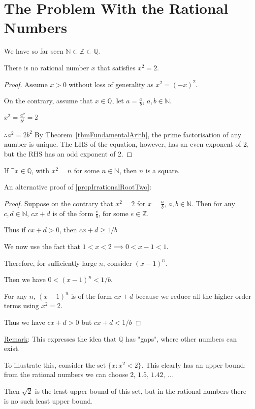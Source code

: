 \documentclass[../Main.tex]{subfiles}
\begin{document}
\section{The Problem With the Rational Numbers}
We have so far seen $\mathbb{N} \subset \mathbb{Z} \subset \mathbb{Q}$.
\begin{proposition}
    There is no rational number $x$ that satisfies $x^2 = 2$. \label{propIrrationalRootTwo}
\end{proposition}
\begin{proof}
    Assume $x>0$ without loss of generality as $x^2 = (-x)^2$.\par
    On the contrary, assume that $x \in \mathbb{Q}$, let $a = \frac{a}{b}$, $a, b \in \mathbb{N}$.\par
    $x^2 = \frac{a^2}{b^2} = 2$\par
    $\therefore a^2 = 2b^2$
    By Theorem~\ref{thmFundamentalArith}, the prime factorisation of any number is unique. The LHS of the equation, however, has an even exponent of 2, but the RHS has an odd exponent of 2. \contradiction
\end{proof}
\begin{corollary}
    If $\exists x \in \mathbb{Q}$, with $x^2=n$ for some $n \in \mathbb{N}$, then $n$ is a square.
\end{corollary}
An alternative proof of \ref{propIrrationalRootTwo}:
\begin{proof}
    Suppose on the contrary that $x^2 = 2$ for $x = \frac{a}{b}$, $a, b \in \mathbb{N}$. Then for any $c, d \in \mathbb{N}$, $cx+d$ is of the form $\frac{e}{b}$, for some $e \in \mathbb{Z}$.\par
    Thus if $cx+d>0$, then $cx+d \geq 1/b$\par
    We now use the fact that $1<x<2 \implies 0<x-1<1$.\par
    Therefore, for sufficiently large $n$, consider $(x-1)^n$.\par
    Then we have $0<(x-1)^n<1/b$.\par
    For any $n$, $(x-1)^n$ is of the form $cx+d$ because we reduce all the higher order terms using $x^2 = 2$.\par
    Thus we have $cx+d > 0$ but $cx+d<1/b$ \contradiction
\end{proof}
\underline{Remark}: This expresses the idea that $\mathbb{Q}$ has "gaps", where other numbers can exist. \par
To illustrate this, consider the set $\{x:x^2<2\}$. This clearly has an upper bound: from the rational numbers we can choose $2$, $1.5$, $1.42$, ...\par
Then $\sqrt{2}$ is the least upper bound of this set, but in the rational numbers there is no such least upper bound.
\end{document}
